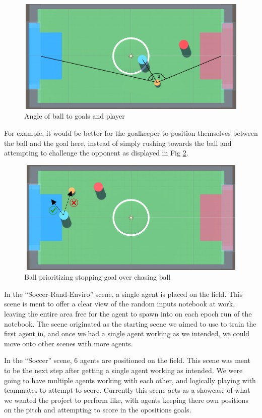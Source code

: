 \begin{figure}[H]
    \centering
    \includegraphics[width=115mm, height=55mm]{img/Image5.png}
    \caption{Angle of ball to goals and player}
    \label{fig:sd4}
\end{figure}

\begin{flushleft}
For example, it would be better for the goalkeeper to position themselves between the ball and the goal here, instead of simply rushing towards the ball and attempting to challenge the opponent as displayed in Fig \ref{fig:sd5}.
\end{flushleft}

\begin{figure}[H]
    \centering
    \includegraphics[width=115mm, height=55mm]{img/Image4.png}
    \caption{Ball prioritizing stopping goal over chasing ball}
    \label{fig:sd5}
\end{figure}

In the “Soccer-Rand-Enviro” scene, a single agent is placed on the field. This scene is ment to offer a clear view of the random inputs notebook at work, leaving the entire area free for the agent to spawn into on each epoch run of the notebook. The scene originated as the starting scene we aimed to use to train the first agent in, and once we had a single agent working as we intended, we could move onto other scenes with more agents.

In the “Soccer” scene, 6 agents are positioned on the field. This scene was ment to be the next step after getting a single agent working as intended. We were going to have multiple agents working with each other, and logically playing with teammates to attempt to score. Currently this scene acts as a showcase of what we wanted the project to perform like, with agents keeping there own positions on the pitch and attempting to score in the opositions goals.

